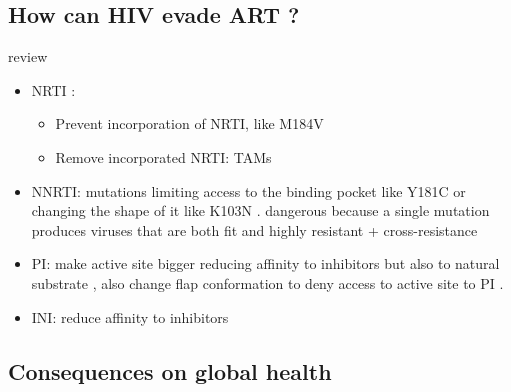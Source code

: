 \documentclass[
  11pt,
  twoside]{scrbook}
\providecommand{\tightlist}{%
  \setlength{\itemsep}{0pt}\setlength{\parskip}{0pt}}
\begin{document}
\hypertarget{how-can-hiv-evade-art}{%
\subsection{How can HIV evade ART ?}\label{how-can-hiv-evade-art}}

review \autocite{ammaranondMechanismHIVAntiretroviral2012,clavelHIVDrugResistance2004}

\begin{itemize}
\tightlist
\item
  NRTI \autocite{menendez-ariasMechanismsResistanceNucleoside2008,sluis-cremerMolecularMechanismsHIV12000}:

  \begin{itemize}
  \item
    Prevent incorporation of NRTI, like M184V \autocite{sarafianosLamivudine3TCResistance1999}
  \item
    Remove incorporated NRTI: TAMs \autocite{meyerMechanismAZTResistance1999,boyerSelectiveExcisionAZTMP2001}
  \end{itemize}
\item
  NNRTI: mutations limiting access to the binding pocket like Y181C or changing the shape of it like K103N \autocite{deeksNonnucleosideReverseTranscriptase2001}. dangerous because a single mutation produces viruses that are both fit and highly resistant \autocite{ammaranondMechanismHIVAntiretroviral2012} + cross-resistance
\item
  PI: make active site bigger reducing affinity to inhibitors but also to natural substrate \autocite{wensingFifteenYearsHIV2010}, also change flap conformation to deny access to active site to PI \autocite{kurtyilmazImprovingViralProtease2016}.
\item
  INI: reduce affinity to inhibitors \autocite{blancoHIV1IntegraseInhibitor2011}
\end{itemize}

\hypertarget{consequences-on-global-health}{%
\subsection{Consequences on global health}\label{consequences-on-global-health}}
\end{document}
